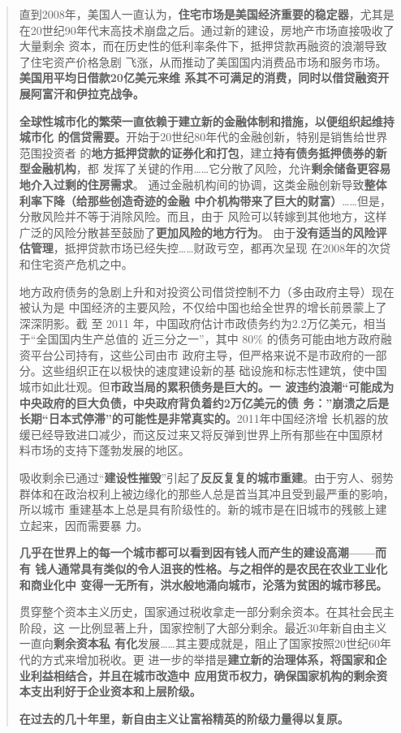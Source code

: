 \begin{quotation}
  直到2008年，美国人一直认为，\textbf{住宅市场是美国经济重要的稳定器}，尤其是
  在20世纪90年代末高技术崩盘之后。通过新的建设，房地产市场直接吸收了大量剩余
  资本，而在历史性的低利率条件下，抵押贷款再融资的浪潮导致了住宅资产价格急剧
  飞涨，从而推动了美国国内消费品市场和服务市场。\textbf{美国用平均日借款20亿美元来维
  系其不可满足的消费，同时以借贷融资开展阿富汗和伊拉克战争。}

  \textbf{全球性城市化的繁荣一直依赖于建立新的金融体制和措施，以便组织起维持城市化
    的信贷需要。}开始于20世纪80年代的金融创新，特别是销售给世界范围投资者
  的\textbf{地方抵押贷款的证券化和打包}，建立\textbf{持有债务抵押债券的新型金融机构}，都
  发挥了关键的作用……它分散了风险，允许\textbf{剩余储备更容易地介入过剩的住房需求}。
  通过金融机构间的协调，这类金融创新导致\textbf{整体利率下降（给那些创造奇迹的金融
    中介机构带来了巨大的财富）}……但是，分散风险并不等于消除风险。而且，由于
  风险可以转嫁到其他地方，这样广泛的风险分散甚至鼓励了\textbf{更加风险的地方行为}。
  由于\textbf{没有适当的风险评估管理}，抵押贷款市场已经失控……财政亏空，都再次呈现
  在2008年的次贷和住宅资产危机之中。

  地方政府债务的急剧上升和对投资公司借贷控制不力（多由政府主导）现在被认为是
  中国经济的主要风险，不仅给中国也给全世界的增长前景蒙上了深深阴影。截
  至 2011 年，中国政府估计市政债务约为2.2万亿美元，相当于“全国国内生产总值的
  近三分之一”，其中 80\% 的债务可能由地方政府融资平台公司持有，这些公司由市
  政府主导，但严格来说不是市政府的一部分。这些组织正在以极快的速度建设新的基
  础设施和标志性建筑，使中国城市如此壮观。但\textbf{市政当局的累积债务是巨大的。一
    波违约浪潮“可能成为中央政府的巨大负债，中央政府背负着约2万亿美元的债
    务：”崩溃之后是长期“日本式停滞”的可能性是非常真实的。}2011年中国经济增
  长机器的放缓已经导致进口减少，而这反过来又将反弹到世界上所有那些在中国原材
  料市场的支持下蓬勃发展的地区。

  吸收剩余已通过“\textbf{建设性摧毁}”引起了\textbf{反反复复的城市重建}。由于穷人、弱势
  群体和在政治权利上被边缘化的那些人总是首当其冲且受到最严重的影响，所以城市
  重建基本上总是具有阶级性的。新的城市是在旧城市的残骸上建立起来，因而需要暴
  力。

  \textbf{几乎在世界上的每一个城市都可以看到因有钱人而产生的建设高潮——而有
    钱人通常具有类似的令人沮丧的性格。与之相伴的是农民在农业工业化和商业化中
    变得一无所有，洪水般地涌向城市，沦落为贫困的城市移民。}

  贯穿整个资本主义历史，国家通过税收拿走一部分剩余资本。在其社会民主阶段，这
  一比例显著上升，国家控制了大部分剩余。最近30年新自由主义一直向\textbf{剩余资本私
    有化}发展……其主要成就是，阻止了国家按照20世纪60年代的方式来增加税收。更
  进一步的举措是\textbf{建立新的治理体系，将国家和企业利益相结合，并且在城市改造中
    应用货币权力，确保国家机构的剩余资本支出利好于企业资本和上层阶级。}

  \textbf{在过去的几十年里，新自由主义让富裕精英的阶级力量得以复原。}
\end{quotation}




